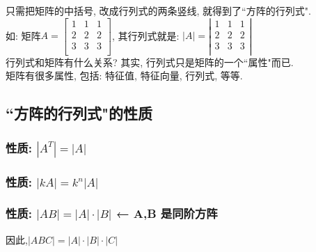 \documentclass[UTF8]{ctexart}
\begin{document}
只需把矩阵的中括号, 改成行列式的两条竖线, 就得到了``方阵的行列式". \\
如: 矩阵$
A=\left[ \begin{matrix}
	1&		1&		1\\
	2&		2&		2\\
	3&		3&		3\\
\end{matrix} \right] 
$, 其行列式就是: 
$
|A|=\left| \begin{matrix}
	1&		1&		1\\
	2&		2&		2\\
	3&		3&		3\\
\end{matrix} \right|
$\\

行列式和矩阵有什么关系? 其实, 行列式只是矩阵的一个``属性"而已. \\
矩阵有很多属性, 包括: 特征值, 特征向量, 行列式, 等等. \\



\subsection{``方阵的行列式"的性质}

\subsubsection{性质: $|A^T|=|A|$}

\subsubsection{   性质: $|kA|=k^n|A|$}

\subsubsection{性质: $|AB|=|A| \cdot |B|$ ← A,B 是同阶方阵}

因此,$|ABC|=|A|\cdot |B|\cdot |C|$\\
\end{document}
